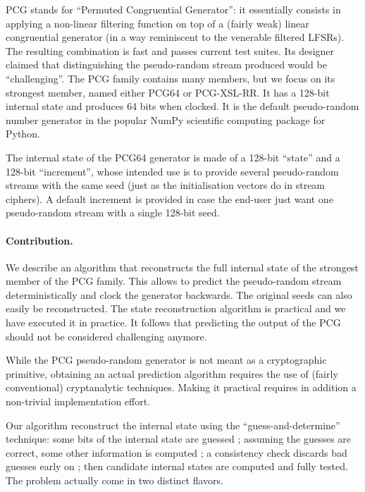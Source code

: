 \documentclass[submission,svgnames,journal=tosc]{iacrtrans}
\begin{document}
\textsf{PCG} stands for ``Permuted Congruential Generator'': it essentially
consists in applying a non-linear filtering function on top of a (fairly weak)
linear congruential generator (in a way reminiscent to the venerable filtered
LFSRs). The resulting combination is fast and passes current test suites. Its
designer claimed that distinguishing the pseudo-random stream produced would be
``challenging''. The \textsf{PCG} family contains many members, but we focus on
its strongest member, named either \textsf{PCG64} or \textsf{PCG-XSL-RR}. It has
a 128-bit internal state and produces 64 bits when clocked. It is the default
pseudo-random number generator in the popular \textsf{NumPy} scientific
computing package for \textsf{Python}.

The internal state of the \textsf{PCG64} generator is made of a 128-bit
``state'' and a 128-bit ``increment'', whose intended use is to provide several
pseudo-random streams with the same seed (just as the initialisation vectors do
in stream ciphers). A default increment is provided in case the end-user just
want one pseudo-random stream with a single 128-bit seed.

\paragraph{Contribution.} We describe an algorithm that reconstructs the full
internal state of the strongest member of the \textsf{PCG} family. This allows
to predict the pseudo-random stream deterministically and clock the generator
backwards. The original seeds can also easily be reconstructed. The state
reconstruction algorithm is practical and we have executed it in practice. It
follows that predicting the output of the \textsf{PCG} should not be considered
challenging anymore.

While the \textsf{PCG} pseudo-random generator is not meant as a cryptographic
primitive, obtaining an actual prediction algorithm requires the use of (fairly
conventional) cryptanalytic techniques. Making it practical requires in addition
a non-trivial implementation effort.

Our algorithm reconstruct the internal state using the ``guess-and-determine''
technique: some bits of the internal state are guessed ; assuming the guesses
are correct, some other information is computed ; a consistency check discards
bad guesses early on ; then candidate internal states are computed and fully
tested. The problem actually come in two distinct flavors.
\end{document}
